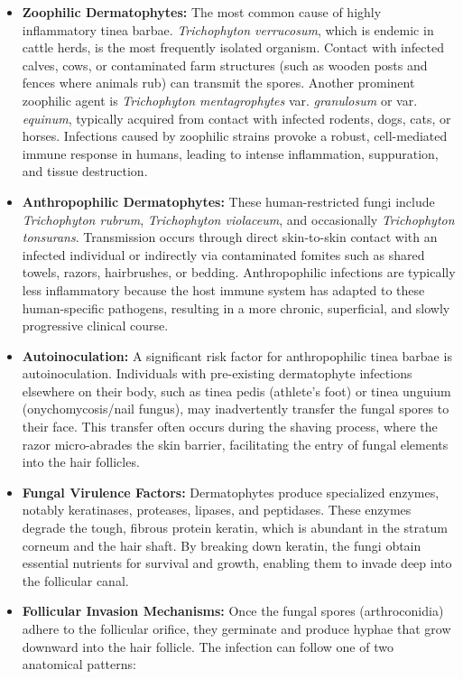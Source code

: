 \begin{itemize}
    \item \textbf{Zoophilic Dermatophytes:} The most common cause of highly inflammatory tinea barbae. \textit{Trichophyton verrucosum}, which is endemic in cattle herds, is the most frequently isolated organism. Contact with infected calves, cows, or contaminated farm structures (such as wooden posts and fences where animals rub) can transmit the spores. Another prominent zoophilic agent is \textit{Trichophyton mentagrophytes} var. \textit{granulosum} or var. \textit{equinum}, typically acquired from contact with infected rodents, dogs, cats, or horses. Infections caused by zoophilic strains provoke a robust, cell-mediated immune response in humans, leading to intense inflammation, suppuration, and tissue destruction.
    \item \textbf{Anthropophilic Dermatophytes:} These human-restricted fungi include \textit{Trichophyton rubrum}, \textit{Trichophyton violaceum}, and occasionally \textit{Trichophyton tonsurans}. Transmission occurs through direct skin-to-skin contact with an infected individual or indirectly via contaminated fomites such as shared towels, razors, hairbrushes, or bedding. Anthropophilic infections are typically less inflammatory because the host immune system has adapted to these human-specific pathogens, resulting in a more chronic, superficial, and slowly progressive clinical course.
    \item \textbf{Autoinoculation:} A significant risk factor for anthropophilic tinea barbae is autoinoculation. Individuals with pre-existing dermatophyte infections elsewhere on their body, such as tinea pedis (athlete's foot) or tinea unguium (onychomycosis/nail fungus), may inadvertently transfer the fungal spores to their face. This transfer often occurs during the shaving process, where the razor micro-abrades the skin barrier, facilitating the entry of fungal elements into the hair follicles.
    \item \textbf{Fungal Virulence Factors:} Dermatophytes produce specialized enzymes, notably keratinases, proteases, lipases, and peptidases. These enzymes degrade the tough, fibrous protein keratin, which is abundant in the stratum corneum and the hair shaft. By breaking down keratin, the fungi obtain essential nutrients for survival and growth, enabling them to invade deep into the follicular canal.
    \item \textbf{Follicular Invasion Mechanisms:} Once the fungal spores (arthroconidia) adhere to the follicular orifice, they germinate and produce hyphae that grow downward into the hair follicle. The infection can follow one of two anatomical patterns:

\end{itemize}
